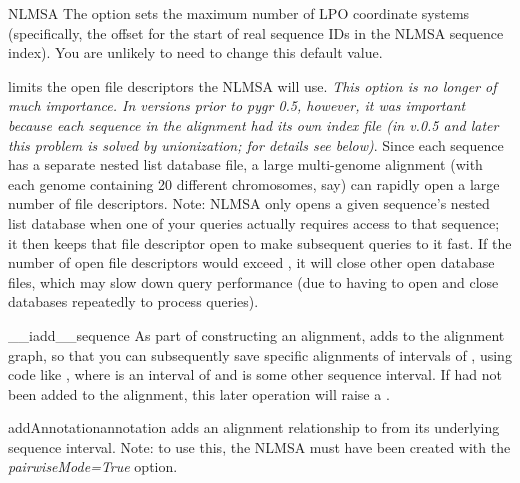\documentclass{howto}
\begin{document}
\begin{funcdesc}{NLMSA}
  The  option sets the maximum number of LPO coordinate systems
  (specifically, the offset for the start of real sequence IDs in the NLMSA
  sequence index).  You are unlikely to need to change this default value.

   limits the open file descriptors the NLMSA will use.
  {\em This option is no longer of much importance.  In versions prior to pygr 0.5,
  however, it was important because each sequence in the alignment had its
  own index file (in v.0.5 and later this problem is solved by unionization;
  for details see below)}.  Since
  each sequence has a separate nested list database file, a large multi-genome alignment
  (with each genome containing 20 different chromosomes, say) can rapidly open a large
  number of file descriptors.  Note: NLMSA only opens a given sequence's nested list database
  when one of your queries actually requires access to that sequence; it then
  keeps that file descriptor open to make subsequent queries to it fast.  If the number
  of open file descriptors would exceed , it will close other open
  database files, which may slow down query performance (due to having to open and close
  databases repeatedly to process queries).

\end{funcdesc}


\begin{funcdesc}{__iadd__}{sequence}
  As part of constructing an alignment, adds  to the alignment graph,
  so that you can subsequently save specific alignments of intervals of
  , using code like , where  is
  an interval of  and  is some other sequence interval.
  If  had not been added to the alignment, this later operation
  will raise a .
\end{funcdesc}

\begin{funcdesc}{addAnnotation}{annotation}
  adds an alignment relationship to  from its underlying
  sequence interval.  Note: to use this, the NLMSA must have been created with the
  {\em pairwiseMode=True} option.
\end{funcdesc}
\end{document}
